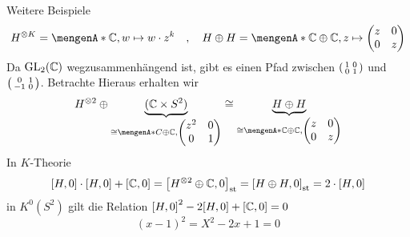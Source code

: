 Weitere Beispiele
\[
	H^{\otimes K} = \set{\mathds{C}, w \mapsto w \cdot z^k} \quad , \quad H \oplus H = \set{\mathds{C} \oplus \mathds{C}, z \mapsto \begin{pmatrix}
		z & 0 \\ 0 & z \end{pmatrix}} 
\]
Da $\GL_2(\mathds{C})$ wegzusammenhängend ist, gibt es einen Pfad zwischen $\begin{psmallmatrix}1 & 0 \\ 0 & 1 \end{psmallmatrix}$ und
$\begin{psmallmatrix} 0& 1 \\ -1 & 0 \end{psmallmatrix}$. Betrachte 
Hieraus erhalten wir
\[
	H^{\otimes 2} \oplus \Underbrace{(\mathds{C} \times S^2)}{\cong \set{C \oplus \mathds{C}, \begin{pmatrix}
		z^2 & 0 \\ 0 & 1
	\end{pmatrix}}} \cong \Underbrace{H \oplus  H}{ \cong \set{\mathds{C} \oplus  \mathds{C}, \begin{pmatrix}
		z & 0 \\
		0 & z
	\end{pmatrix}}  }
\]
In $K$-Theorie
\[
	\benbrace*{H,0} \cdot \benbrace*{H,0} + \benbrace*{\mathds{C},0}    = \benbrace*{H^{\otimes 2} \oplus \mathds{C},0}_\st 
	= \benbrace*{H \oplus H,0}_\st = 2 \cdot \benbrace*{H,0} 
\]
in $K^0(S^2)$ gilt die Relation $\benbrace*{H,0}^2 - 2 \benbrace*{H,0} + \benbrace*{\mathds{C},0}= 0 $
\[
	(x-1)^2 = X^2 - 2x +1 = 0
\]

